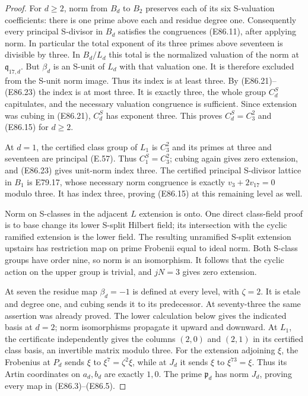 \begin{proof}
For $d\ge2$, norm from $B_d$ to $B_2$ preserves
each of its six S-valuation coefficients:
there is one prime above each and residue
degree one. Consequently every principal
S-divisor in $B_d$ satisfies the congruences
(E86.11), after applying norm. In particular
the total exponent of its three primes above
seventeen is divisible by three. In $B_d/L_d$
this total is the normalized valuation of the
norm at $\mathfrak q_{17,d}$. But $\beta_d$
is an S-unit of $L_d$ with that valuation one.
It is therefore excluded from the S-unit
norm image. Thus its index is at least three.
By (E86.21)--(E86.23) the index is at most
three. It is exactly three, the whole group
$C_d^S$ capitulates, and the necessary
valuation congruence is sufficient.
Since extension was cubing in (E86.21),
$C_d^S$ has exponent three. This proves
$C_d^S=C_3^2$ and (E86.15) for $d\ge2$.

At $d=1$, the certified class group of $L_1$
is $C_3^2$ and its primes at three and seventeen
are principal (E.57). Thus $C_1^S=C_3^2$;
cubing again gives zero extension, and
(E86.23) gives unit-norm index three.
The certified principal S-divisor lattice in
$B_1$ is E79.17, whose necessary norm congruence
is exactly $v_3+2v_{17}=0$ modulo three.
It has index three, proving (E86.15) at this
remaining level as well.

Norm on S-classes in the adjacent $L$ extension
is onto. One direct class-field proof is to
base change its lower S-split Hilbert field;
its intersection with the cyclic ramified
extension is the lower field. The resulting
unramified S-split extension upstairs has
restriction map on prime Frobenii equal to
ideal norm. Both S-class groups have order
nine, so norm is an isomorphism. It follows
that the cyclic action on the upper group is
trivial, and $jN=3$ gives zero extension.

At seven the residue map $\beta_d=-1$ is
defined at every level, with $\zeta=2$.
It is etale and degree one, and cubing sends
it to its predecessor. At seventy-three the
same assertion was already proved. The
lower calculation below gives the indicated
basis at $d=2$; norm isomorphisms propagate
it upward and downward. At $L_1$, the
certificate independently gives the columns
$(2,0)$ and $(2,1)$ in its certified class
basis, an invertible matrix modulo three.
For the extension adjoining $\xi$, the
Frobenius at $P_d$ sends $\xi$ to
$\xi^7=\zeta^2\xi$, while at $J_d$ it
sends $\xi$ to $\xi^{73}=\xi$.
Thus its Artin coordinates on $a_d,b_d$
are exactly $1,0$. The prime $\mathfrak p_d$
has norm $J_d$, proving every map in
(E86.3)--(E86.5).


\end{proof}
